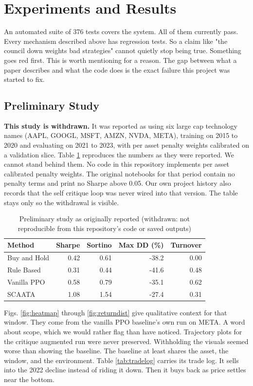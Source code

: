 \documentclass[conference]{IEEEtran}
\begin{document}
\section{Experiments and Results}
\label{sec:extended}

An automated suite of 376 tests covers the system. All of them currently pass. Every mechanism described above has regression tests. So a claim like "the council down weights bad strategies" cannot quietly stop being true. Something goes red first. This is worth mentioning for a reason. The gap between what a paper describes and what the code does is the exact failure this project was started to fix.

\subsection{Preliminary Study}

\textbf{This study is withdrawn.} It was reported as using six large cap technology names (AAPL, GOOGL, MSFT, AMZN, NVDA, META), training on 2015 to 2020 and evaluating on 2021 to 2023, with per asset penalty weights calibrated on a validation slice. Table \ref{tab:prelimresults} reproduces the numbers as they were reported. We cannot stand behind them. No code in this repository implements per asset calibrated penalty weights. The original notebooks for that period contain no penalty terms and print no Sharpe above 0.05. Our own project history also records that the self critique loop was never wired into that version. The table stays only so the withdrawal is visible.

\begin{table}[t]
\caption{Preliminary study as originally reported (withdrawn: not reproducible from this repository's code or saved outputs)}
\label{tab:prelimresults}
\centering
\begin{tabular}{lrrrr}
\toprule
Method & Sharpe & Sortino & Max DD (\%) & Turnover \\
\midrule
Buy and Hold & 0.42 & 0.61 & -38.2 & 0.00 \\
Rule Based & 0.31 & 0.44 & -41.6 & 0.48 \\
Vanilla PPO & 0.58 & 0.79 & -35.1 & 0.62 \\
SCAATA & 1.08 & 1.54 & -27.4 & 0.31 \\
\bottomrule
\end{tabular}
\end{table}

Figs. \ref{fig:heatmap} through \ref{fig:returndist} give qualitative context for that window. They come from the vanilla PPO baseline's own run on META. A word about scope, which we would rather flag than have noticed. Trajectory plots for the critique augmented run were never preserved. Withholding the visuals seemed worse than showing the baseline. The baseline at least shares the asset, the window, and the environment. Table \ref{tab:tradelog} carries its trade log. It sells into the 2022 decline instead of riding it down. Then it buys back as price settles near the bottom.
\end{document}

